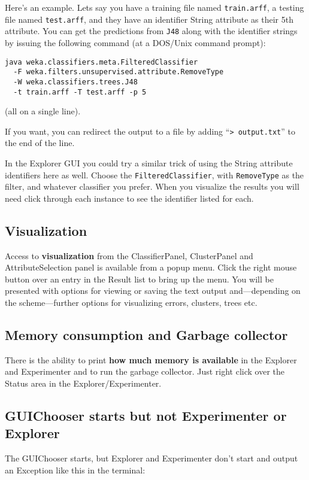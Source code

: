 Here's an example. Lets say you have a training file named \verb=train.arff=,
a testing file named \verb=test.arff=, and they have an identifier String
attribute as their 5th attribute. You can get the predictions from \verb=J48=
along with the identifier strings by issuing the following command (at
a DOS/Unix command prompt):

\begin{verbatim}
java weka.classifiers.meta.FilteredClassifier
  -F weka.filters.unsupervised.attribute.RemoveType
  -W weka.classifiers.trees.J48
  -t train.arff -T test.arff -p 5
\end{verbatim}

\noindent (all on a single line).

If you want, you can redirect the output to a file by adding
``\verb=> output.txt='' to the end of the line.

In the Explorer GUI you could try a similar trick of using the String
attribute identifiers here as well. Choose the \verb=FilteredClassifier=,
with \verb=RemoveType= as the filter, and whatever classifier you
prefer. When you visualize the results you will need click through
each instance to see the identifier listed for each.

\subsection{Visualization}
Access to \textbf{visualization} from the ClassifierPanel, ClusterPanel and
AttributeSelection panel is available from a popup menu. Click the
right mouse button over an entry in the Result list to bring up the
menu. You will be presented with options for viewing or saving the
text output and---depending on the scheme---further options for
visualizing errors, clusters, trees etc.

\subsection{Memory consumption and Garbage collector}
There is the ability to print \textbf{how much memory is available} in the
Explorer and Experimenter and to run the garbage collector. Just right
click over the Status area in the Explorer/Experimenter.

\subsection{GUIChooser starts but not Experimenter or Explorer}
\label{GUIChooserButNotExplorer}
The GUIChooser starts, but Explorer and Experimenter don't start and
output an Exception like this in the terminal:

